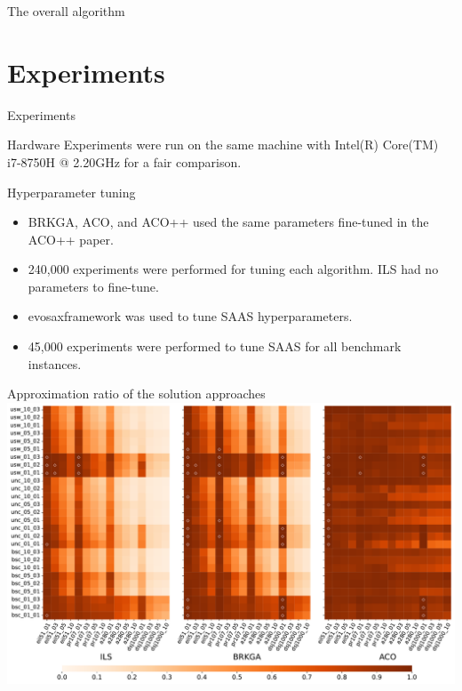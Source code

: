 \documentclass[aspectratio=169]{beamer}
\begin{document}
\begin{frame}{The overall algorithm}
    \vspace{0.1cm}
    \centering
    
\end{frame}

\section{Experiments}
\begin{frame}{Experiments}
    \begin{block}{Hardware}
        Experiments were run on the same machine with Intel(R) Core(TM) i7-8750H @ 2.20GHz for a fair comparison.
    \end{block}
    \begin{block}{Hyperparameter tuning}
        \begin{itemize}
            \item BRKGA, ACO, and ACO++ used the same parameters fine-tuned in the ACO++ paper.
            \item 240,000 experiments were performed for tuning each algorithm. ILS had no parameters to fine-tune.
            \item evosax\footnotemark framework was used to tune SAAS hyperparameters.
            \item 45,000 experiments were performed to tune SAAS for all benchmark instances.
        \end{itemize}
    \end{block}
\end{frame}
\begin{frame}{Approximation ratio of the solution approaches}
    \centering
    \includegraphics[width=0.7\linewidth]{img/profit_ratio_horizontal_1.pdf}
\end{frame}
\end{document}

